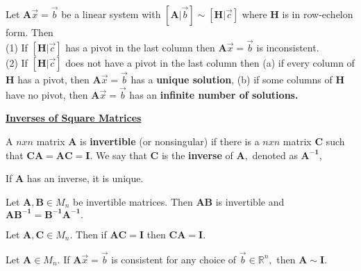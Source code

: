 \documentclass{article}
\begin{document}
    \begin{theorem}[Solutions of $\boldsymbol{A}\vec{x} = \vec{b}$]
    Let $\boldsymbol{A}\vec{x} = \vec{b}$ be a linear system with $[\boldsymbol{A} | \vec{b}] \sim [\boldsymbol{H} | \vec{c}]$ where $\boldsymbol{H}$ is in row-echelon form. Then \\
    (1) If $[\boldsymbol{H} | \vec{c}]$ has a pivot in the last column then  $\boldsymbol{A}\vec{x} = \vec{b}$ is inconsistent. \\
    (2) If $[\boldsymbol{H} | \vec{c}]$ does not have a pivot in the last column then (a) if every column of $\boldsymbol{H}$ has a pivot, then $\boldsymbol{A}\vec{x} = \vec{b}$ has a \textbf{unique solution}, (b) if some columns of $\boldsymbol{H}$ have no pivot, then $\boldsymbol{A}\vec{x} = \vec{b}$ has an \textbf{infinite number of solutions.}

    \end{theorem}
    
    \newpage
    
\textbf{\underline{Inverses of Square Matrices}}

    \begin{definition}
    A $n x n$ matrix $\boldsymbol{A}$ is \textbf{invertible} (or nonsingular) if there is a $n x n$ matrix $\boldsymbol{C}$ such that $\boldsymbol{CA = AC = I}.$ We say that $\boldsymbol{C}$ is the \textbf{inverse} of $\boldsymbol{A},$ denoted as $\boldsymbol{A^{-1}}$,
    \end{definition}
    
    \begin{theorem}
    If $\boldsymbol{A}$ has an inverse, it is unique.
    \end{theorem}
    
    \begin{theorem}
    Let $\boldsymbol{A, B} \in M_n$ be invertible matrices. Then $\boldsymbol{AB}$ is invertible and $\boldsymbol{AB^{-1} = B^{-1}{A^{-1}}}.$ 
    \end{theorem}
    
    \begin{theorem}
    Let $\boldsymbol{A, C} \in M_n$. Then if $\boldsymbol{AC = I}$ then $\boldsymbol{CA = I}.$
    \end{theorem}    
    
    \begin{lemma}
    Let $\boldsymbol{A} \in M_n.$ If $\boldsymbol{A}\vec{x} = \vec{b}$ is consistent for any choice of $\vec{b} \in \mathbb{R}^n,$ then $\boldsymbol{A} \sim \boldsymbol{I}.$
    \end{lemma}
\end{document}
